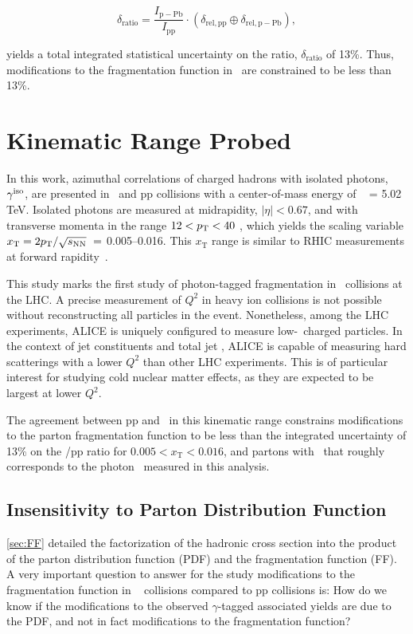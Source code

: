 \begin{equation}
    \delta_\mathrm{ratio} = \frac{I_\mathrm{p-Pb}}{I_\mathrm{pp}}\cdot (\delta_\mathrm{rel,pp} \oplus \delta_\mathrm{rel,p-Pb}),
\end{equation}

yields a total integrated statistical uncertainty on the ratio, $\delta_\mathrm{ratio}$ of 13\%. Thus, modifications to the fragmentation function in \pPb~are constrained to be less than 13\%.


\section{Kinematic Range Probed}

In this work, azimuthal correlations of charged hadrons with isolated photons, $\gamma^\mathrm{iso}$, are presented in \pPb~and pp collisions with a center-of-mass energy of \sqrtsNN~ = 5.02 TeV. Isolated photons are measured at midrapidity, {$|\eta|<0.67$}, and with transverse momenta in the range $12 <p_{\mathrm{T}}<40$ \GeVc, which yields the scaling variable {$x_{\mathrm{T}} = 2\pt/\sqrt{s_{\mathrm{NN}}}\ = $ 0.005--0.016}. This $x_{\mathrm{T}}$ range is similar to RHIC measurements at forward rapidity~\cite{Adare:2011sc}.

This study marks the first study of photon-tagged fragmentation in \pPb~collisions at the LHC. A precise measurement of $Q^2$ in heavy ion collisions is not possible without reconstructing all particles in the event. Nonetheless, among the LHC experiments, ALICE is uniquely configured to measure low-\pt~charged particles. In the context of jet constituents and total jet \pt, ALICE is capable of measuring hard scatterings with a lower $Q^{2}$ than other LHC experiments. This is of particular interest for studying cold nuclear matter effects, as they are expected to be largest at lower $Q^{2}$. 

The agreement between pp and \pPb~in this kinematic range constrains modifications to the parton fragmentation function to be less than the integrated uncertainty of 13\% on the \pPb/pp ratio for $ 0.005 < x_{\mathrm{T}} < 0.016$, and partons with \pt~that roughly corresponds to the photon \pt~measured in this analysis.

\subsection{Insensitivity to Parton Distribution Function}
\ref{sec:FF} detailed the factorization of the hadronic cross section into the product of the parton distribution function (PDF) and the fragmentation function (FF). A very important question to answer for the study modifications to the fragmentation function in \pPb~ collisions compared to pp collisions is: How do we know if the modifications to the observed $\gamma$-tagged associated yields are due to the PDF, and not in fact modifications to the fragmentation function?

